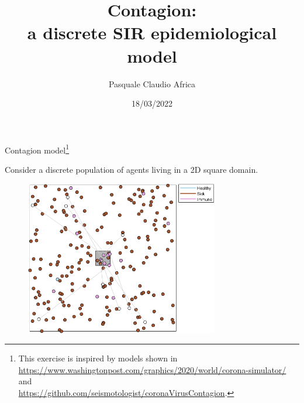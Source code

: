 \documentclass[10pt]{beamer}
\begin{document}
    \title{Contagion:\\a discrete SIR epidemiological model}
    \author{Pasquale Claudio Africa}
    \date{18/03/2022}
    
\begin{frame}
    \maketitle
\end{frame}

\begin{frame}{Contagion model\footnote{This exercise is inspired by models shown in \\
\url{https://www.washingtonpost.com/graphics/2020/world/corona-simulator/} and \\
\url{https://github.com/seismotologist/coronaVirusContagion}.}}

Consider a discrete population of agents living in a 2D square domain.

\begin{figure}
    \includegraphics[width=0.75\textwidth]{contagion.png}
\end{figure}
\end{frame}
\end{document}
